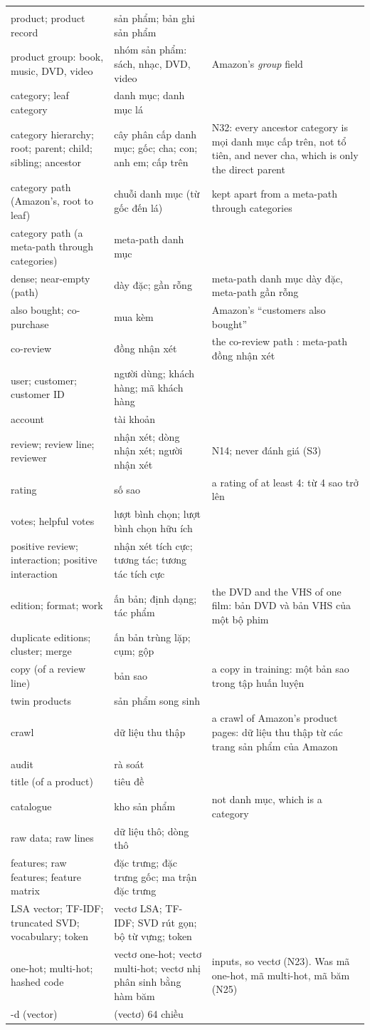 \documentclass[11pt,a4paper]{article}
\makeatletter
\DeclareRobustCommand{\code}[1]{\texttt{\detokenize{#1}}}
\newcommand{\vi}[1]{\foreignlanguage{vietnamese}{#1}}
\newcommand{\g}[3]{#1 & \vi{#2} & #3 \\}
\newcommand{\grp}[1]{\addlinespace[6pt]\multicolumn{3}{@{}l}{\textbf{#1}} \\ \addlinespace[2pt]}
\makeatother
\begin{document}
{\begin{longtable}{@{}>{\raggedright\arraybackslash}p{}%
  >{\raggedright\arraybackslash}p{}%
  >{\raggedright\arraybackslash}p{}@{}}
  \grp{B. Products, users and the data}
  \g{product; product record}{sản phẩm; bản ghi sản phẩm}{}
  \g{product group: book, music, DVD, video}{nhóm sản phẩm: sách, nhạc, DVD, video}{Amazon's
    \emph{group} field}
  \g{category; leaf category}{danh mục; danh mục lá}{}
  \g{category hierarchy; root; parent; child; sibling; ancestor}{cây phân cấp danh mục; gốc;
    cha; con; anh em; cấp trên}{N32: every ancestor category is \vi{mọi danh mục cấp trên}, not
    \vi{tổ tiên}, and never \vi{cha}, which is only the direct parent}
  \g{category path (Amazon's, root to leaf)}{chuỗi danh mục (từ gốc đến lá)}{kept apart from a
    meta-path through categories}
  \g{category path (a meta-path through categories)}{meta-path danh mục}{}
  \g{dense; near-empty (path)}{dày đặc; gần rỗng}{\vi{meta-path danh mục dày đặc}, \vi{meta-path
    gần rỗng}}
  \g{also bought; co-purchase}{mua kèm}{Amazon's ``customers also bought''}
  \g{co-review}{đồng nhận xét}{the co-review path \code{PUP}: \vi{meta-path đồng nhận xét
    \code{PUP}}}
  \g{user; customer; customer ID}{người dùng; khách hàng; mã khách hàng}{}
  \g{account}{tài khoản}{}
  \g{review; review line; reviewer}{nhận xét; dòng nhận xét; người nhận xét}{N14; never
    \vi{đánh giá} (S3)}
  \g{rating}{số sao}{a rating of at least 4: \vi{từ 4 sao trở lên}}
  \g{votes; helpful votes}{lượt bình chọn; lượt bình chọn hữu ích}{}
  \g{positive review; interaction; positive interaction}{nhận xét tích cực; tương tác; tương tác
    tích cực}{}
  \g{edition; format; work}{ấn bản; định dạng; tác phẩm}{the DVD and the VHS of one film: \vi{bản
    DVD và bản VHS của một bộ phim}}
  \g{duplicate editions; cluster; merge}{ấn bản trùng lặp; cụm; gộp}{}
  \g{copy (of a review line)}{bản sao}{a copy in training: \vi{một bản sao trong tập huấn
    luyện}}
  \g{twin products}{sản phẩm song sinh}{}
  \g{crawl}{dữ liệu thu thập}{a crawl of Amazon's product pages: \vi{dữ liệu thu thập từ các
    trang sản phẩm của Amazon}}
  \g{audit}{rà soát}{}
  \g{title (of a product)}{tiêu đề}{}
  \g{catalogue}{kho sản phẩm}{not \vi{danh mục}, which is a category}
  \g{raw data; raw lines}{dữ liệu thô; dòng thô}{}
  \g{features; raw features; feature matrix}{đặc trưng; đặc trưng gốc; ma trận đặc
    trưng}{}
  \g{LSA vector; TF-IDF; truncated SVD; vocabulary; token}{vectơ LSA; TF-IDF; SVD rút gọn; bộ từ
    vựng; token}{}
  \g{one-hot; multi-hot; hashed code}{vectơ one-hot; vectơ multi-hot; vectơ nhị phân sinh bằng hàm
    băm}{inputs, so \vi{vectơ} (N23). Was \vi{mã one-hot}, \vi{mã multi-hot}, \vi{mã băm} (N25)}
  \g{64-d (vector)}{(vectơ) 64 chiều}{}


\end{longtable}}
\end{document}
